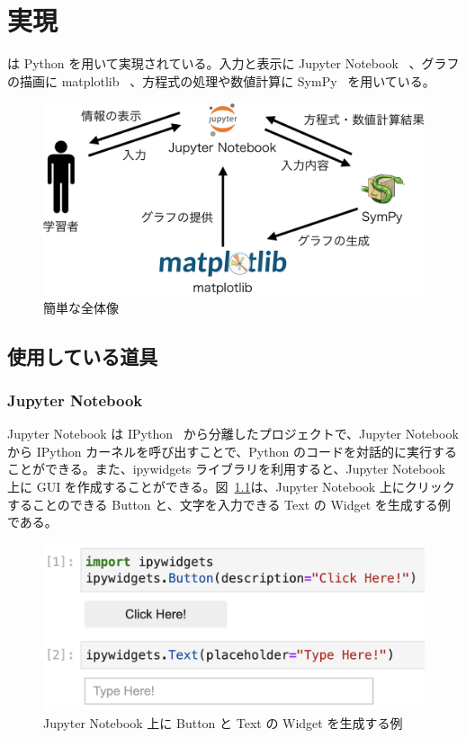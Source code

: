 \chapter{実現} \label{implementation}

\simname は Python を用いて実現されている。入力と表示に Jupyter Notebook~\cite{kluyver_jupyter_nodate} 、グラフの描画に matplotlib~\cite{hunter_matplotlib_2007} 、方程式の処理や数値計算に SymPy~\cite{meurer_sympy_2017} を用いている。

\begin{figure}[htb]
\centering
\includegraphics[width=0.8\linewidth]{work/imple_diagram-crop.pdf}
\caption{簡単な全体像}
\end{figure}

\section{使用している道具}

\subsection{Jupyter Notebook}
Jupyter Notebook は IPython~\cite{perez_ipython_2007} から分離したプロジェクトで、Jupyter Notebook から IPython カーネルを呼び出すことで、Python のコードを対話的に実行することができる。また、ipywidgets ライブラリを利用すると、Jupyter Notebook 上に GUI を作成することができる。図~\ref{example_jupyter}は、Jupyter Notebook 上にクリックすることのできる Button と、文字を入力できる Text の Widget を生成する例である。

\begin{figure}[hbt]
\centering
\includegraphics[width=0.7\linewidth]{work/example_jupyter.png}
\caption{Jupyter Notebook 上に Button と Text の
Widget を生成する例} \label{example_jupyter}
\end{figure}

